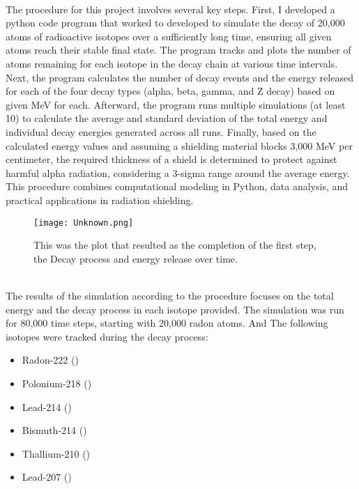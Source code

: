 \documentclass[12pt]{article}
\begin{document}
\vspace{1cm} 
\\
The procedure for this project involves several key steps. First, I developed a python code program that worked to developed to simulate the decay of 20,000 atoms of radioactive isotopes over a sufficiently long time, ensuring all given atoms reach their stable final state. The program tracks and plots the number of atoms remaining for each isotope in the decay chain at various time intervals. Next, the program calculates the number of decay events and the energy released for each of the four decay types (alpha, beta, gamma, and Z decay) based on given MeV for each. Afterward, the program runs multiple simulations (at least 10) to calculate the average and standard deviation of the total energy and individual decay energies generated across all runs. Finally, based on the calculated energy values and assuming a shielding material blocks 3,000 MeV per centimeter, the required thickness of a shield is determined to protect against harmful alpha radiation, considering a 3-sigma range around the average energy. This procedure combines computational modeling in Python, data analysis, and practical applications in radiation shielding.

\vspace{1cm} 
\begin{figure}[h!]
    \centering
    \texttt{[image: Unknown.png]}
    \caption{This was the plot that resulted as the completion      of the first step, the Decay process and energy release     over time.}
    \label{fig:decay_process}
\end{figure}

\\ 

The results of the simulation according to the procedure focuses on the total energy and the decay process in each isotope provided.
The simulation was run for 80,000 time steps, starting with 20,000 radon atoms. And The following isotopes were tracked during the decay process:
\begin{itemize}
    \item Radon-222 ()
    \item Polonium-218 ()
    \item Lead-214 ()
    \item Bismuth-214 ()
    \item Thallium-210 ()
    \item Lead-207 ()
\end{itemize}
\end{document}
